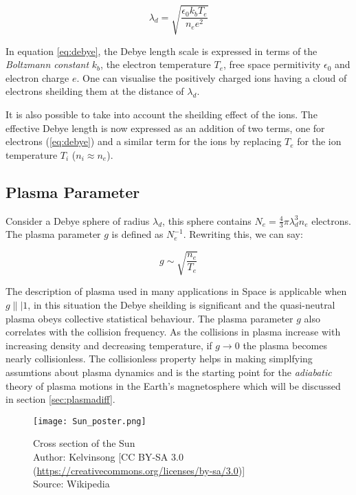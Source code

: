 \begin{equation}\label{eq:debye}
    \lambda_d = \sqrt{\frac{\epsilon_0 k_b T_e}{n_e e^2}}
\end{equation}

In equation \ref{eq:debye}, the Debye length scale is expressed in terms of the \emph{Boltzmann constant} $k_b$, 
the electron temperature $T_e$, free space permitivity $\epsilon_0$ and electron charge $e$. One can visualise the 
positively charged ions having a cloud of electrons sheilding them at the distance of $\lambda_d$. 

It is also possible to take into account the sheilding effect of the ions. The effective Debye length is now 
expressed as an addition of two terms, one for electrons (\ref{eq:debye}) and a similar term for the ions by replacing 
$T_e$ for the ion temperature $T_i$ ($n_i \approx n_e$). 

\subsection*{Plasma Parameter}

Consider a Debye sphere of radius $\lambda_d$, this sphere contains $N_e = \frac{4}{3}\pi \lambda^3_d n_e$ electrons. 
The plasma parameter $g$ is defined as $N_{e}^{-1}$. Rewriting this, we can say:

\begin{equation}
    g \sim \sqrt{\frac{n_e}{T_e}}
\end{equation}

The description of plasma used in many applications in Space is applicable when $g \|| 1$, in this situation 
the Debye sheilding is significant and the quasi-neutral plasma obeys collective statistical behaviour. 
The plasma parameter $g$ also correlates with the collision frequency. As the collisions in plasma increase 
with increasing density and decreasing temperature, if $g \longrightarrow 0$ the plasma becomes nearly collisionless. 
The collisionless property helps in making simplfying assumtions about plasma dynamics and is the starting point 
for the \emph{adiabatic} theory of plasma motions in the Earth's magnetosphere which will be discussed in section 
\ref{sec:plasmadiff}.

\begin{figure}
    \noindent\texttt{[image: Sun\_poster.png]}
    \caption{\small Cross section of the Sun \\ 
    Author: Kelvinsong [CC BY-SA 3.0 (\url{https://creativecommons.org/licenses/by-sa/3.0})] \\ 
    Source: Wikipedia}
    \label{fig:SunLayers}
\end{figure}


